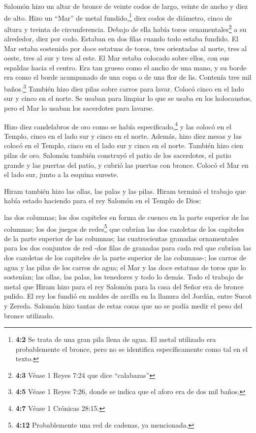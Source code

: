  Salomón hizo un altar de bronce de veinte codos de largo,
veinte de ancho y diez de alto.  Hizo un ``Mar'' de metal
fundido,\footnote{\textbf{4:2} Se trata de una gran pila llena de agua.
  El metal utilizado era probablemente el bronce, pero no se identifica
  específicamente como tal en el texto.} diez codos de diámetro, cinco
de altura y treinta de circunferencia.  Debajo de ella
había toros ornamentales\footnote{\textbf{4:3} Véase 1 Reyes 7:24 que
  dice ``calabazas''} a su alrededor, diez por codo. Estaban en dos
filas cuando todo estaba fundido.  El Mar estaba sostenido
por doce estatuas de toros, tres orientadas al norte, tres al oeste,
tres al sur y tres al este. El Mar estaba colocado sobre ellos, con sus
espaldas hacia el centro.  Era tan grueso como el ancho de
una mano, y su borde era como el borde acampanado de una copa o de una
flor de lis. Contenía tres mil baños.\footnote{\textbf{4:5} Véase 1
  Reyes 7:26, donde se indica que el aforo era de dos mil baños.}
 También hizo diez pilas sobre carros para lavar. Colocó
cinco en el lado sur y cinco en el norte. Se usaban para limpiar lo que
se usaba en los holocaustos, pero el Mar lo usaban los sacerdotes para
lavarse.

 Hizo diez candelabros de oro como se había
especificado,\footnote{\textbf{4:7} Véase 1 Crónicas 28:15.} y las
colocó en el Templo, cinco en el lado sur y cinco en el norte.
 Además, hizo diez mesas y las colocó en el Templo, cinco
en el lado sur y cinco en el norte. También hizo cien pilas de oro.
 Salomón también construyó el patio de los sacerdotes, el
patio grande y las puertas del patio, y cubrió las puertas con bronce.
 Colocó el Mar en el lado sur, junto a la esquina
sureste.

 Hiram también hizo las ollas, las palas y las pilas.
Hiram terminó el trabajo que había estado haciendo para el rey Salomón
en el Templo de Dios:

 las dos columnas; los dos capiteles en forma de cuenco
en la parte superior de las columnas; los dos juegos de redes\footnote{\textbf{4:12}
  Probablemente una red de cadenas, ya mencionada.} que cubrían las dos
cazoletas de los capiteles de la parte superior de las columnas;
 las cuatrocientas granadas ornamentales para los dos
conjuntos de red -dos filas de granadas para cada red que cubrían las
dos cazoletas de los capiteles de la parte superior de las columnas-;
 los carros de agua y las pilas de los carros de agua;
 el Mar y las doce estatuas de toros que lo sostenían;
las ollas, las palas, los tenedores y todo lo demás. 
Todo el trabajo de metal que Hiram hizo para el rey Salomón para la casa
del Señor era de bronce pulido.  El rey los fundió en
moldes de arcilla en la llanura del Jordán, entre Sucot y Zereda.
 Salomón hizo tantas de estas cosas que no se podía medir
el peso del bronce utilizado.

